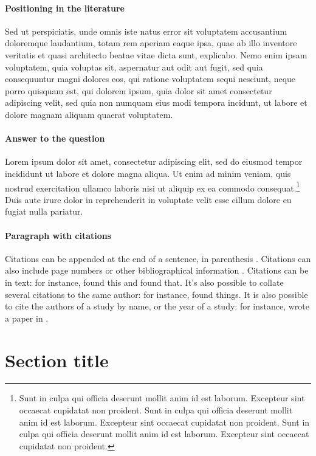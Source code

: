 \documentclass[letterpaper,12pt,leqno]{article}
\begin{document}
\paragraph{Positioning in the literature} Sed ut perspiciatis, unde omnis iste natus error sit voluptatem accusantium doloremque laudantium, totam rem aperiam eaque ipsa, quae ab illo inventore veritatis et quasi architecto beatae vitae dicta sunt, explicabo. Nemo enim ipsam voluptatem, quia voluptas sit, aspernatur aut odit aut fugit, sed quia consequuntur magni dolores eos, qui ratione voluptatem sequi nesciunt, neque porro quisquam est, qui dolorem ipsum, quia dolor sit amet consectetur adipiscing velit, sed quia non numquam eius modi tempora incidunt, ut labore et dolore magnam aliquam quaerat voluptatem.

\paragraph{Answer to the question} Lorem ipsum dolor sit amet, consectetur adipiscing elit, sed do eiusmod tempor incididunt ut labore et dolore magna aliqua. Ut enim ad minim veniam, quis nostrud exercitation ullamco laboris nisi ut aliquip ex ea commodo consequat.\footnote{Sunt in culpa qui officia deserunt mollit anim id est laborum. Excepteur sint occaecat cupidatat non proident. Sunt in culpa qui officia deserunt mollit anim id est laborum. Excepteur sint occaecat cupidatat non proident. Sunt in culpa qui officia deserunt mollit anim id est laborum. Excepteur sint occaecat cupidatat non proident.} Duis aute irure dolor in reprehenderit in voluptate velit esse cillum dolore eu fugiat nulla pariatur. 

\paragraph{Paragraph with citations} Citations can be appended at the end of a sentence, in parenthesis \citep{LMS18a}. Citations can also include page numbers or other bibliographical information \citep[p. 1305]{MS19}. Citations can be in text: for instance, \citet{M12} found this and \citet{M14} found that. It's also possible to collate several citations to the same author: for instance, \citet{M12,M14} found things. It is also possible to cite the authors of a study by name, or the year of a study: for instance, \citeauthor{EMM21} wrote a paper in \citeyear{EMM21}.

\section{Section title}\label{s:section}
\end{document}
